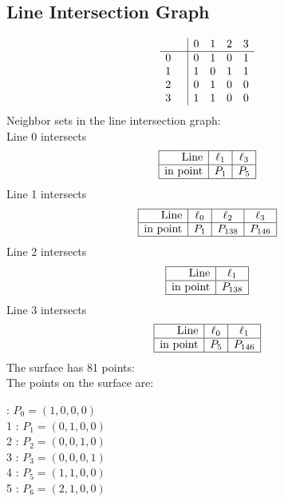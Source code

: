 \documentclass{article}
\begin{document}
{\subsection*{Line Intersection Graph}
{\arraycolsep=1pt
$$
\begin{array}{rr|*{4}r}
 &  & 0 & 1 & 2 & 3\\
\hline
0 &  & 0 & 1 & 0 & 1\\
1 &  & 1 & 0 & 1 & 1\\
2 &  & 0 & 1 & 0 & 0\\
3 &  & 1 & 1 & 0 & 0\\
\end{array}
$$
}%
Neighbor sets in the line intersection graph:\\
Line 0 intersects 
$$
\begin{array}{|r*{2}{|c}|}
\hline
\mbox{Line}  & \ell_{1} & \ell_{3}\\
\hline
\mbox{in point}  & P_{1} & P_{5}\\
\hline
\end{array}
$$
Line 1 intersects 
$$
\begin{array}{|r*{3}{|c}|}
\hline
\mbox{Line}  & \ell_{0} & \ell_{2} & \ell_{3}\\
\hline
\mbox{in point}  & P_{1} & P_{138} & P_{146}\\
\hline
\end{array}
$$
Line 2 intersects 
$$
\begin{array}{|r*{1}{|c}|}
\hline
\mbox{Line}  & \ell_{1}\\
\hline
\mbox{in point}  & P_{138}\\
\hline
\end{array}
$$
Line 3 intersects 
$$
\begin{array}{|r*{2}{|c}|}
\hline
\mbox{Line}  & \ell_{0} & \ell_{1}\\
\hline
\mbox{in point}  & P_{5} & P_{146}\\
\hline
\end{array}
$$
The surface has 81 points:\\
The points on the surface are:\\
\begin{multicols}{3}
 : $P_{0}=( 1, 0, 0, 0 )$\\
1 : $P_{1}=( 0, 1, 0, 0 )$\\
2 : $P_{2}=( 0, 0, 1, 0 )$\\
3 : $P_{3}=( 0, 0, 0, 1 )$\\
4 : $P_{5}=( 1, 1, 0, 0 )$\\
5 : $P_{6}=( 2, 1, 0, 0 )$\\

\end{multicols}}
\end{document}
